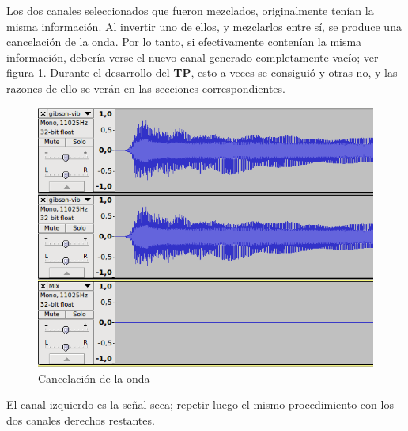 Los dos canales seleccionados que fueron mezclados, originalmente tenían la misma información. Al invertir uno de ellos, y mezclarlos entre sí, se produce una cancelación de la onda. Por lo tanto, si efectivamente contenían la misma información, debería verse el nuevo canal generado completamente vacío; ver figura \ref{fig:audacity-no-wave}. Durante el desarrollo del \textbf{TP}, esto a veces se consiguió y otras no, y las razones de ello se verán en las secciones correspondientes.

\begin{figure}[H]
    \centering
    \includegraphics[scale=0.70]{imagenes/audacity-no-wave.png}
    \caption{Cancelación de la onda}
    \label{fig:audacity-no-wave}
\end{figure}

El canal izquierdo es la señal seca; repetir luego el mismo procedimiento con los dos canales derechos restantes. 
